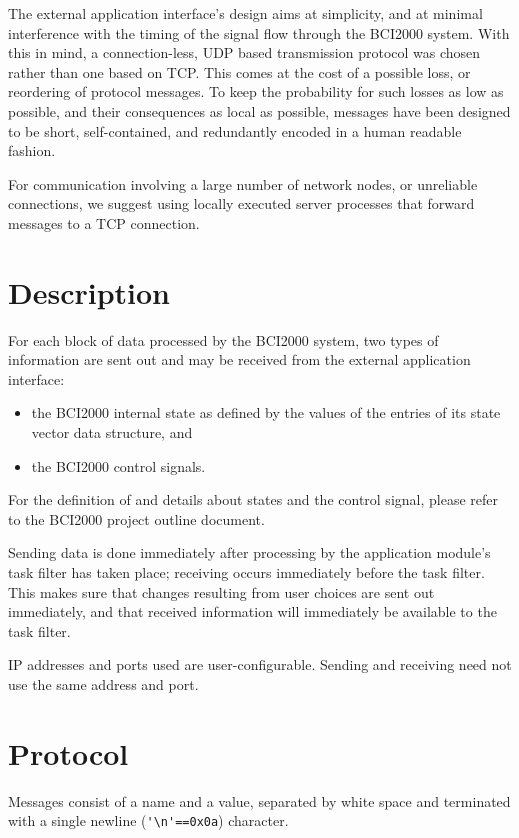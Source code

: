 \documentclass[12pt,letterpaper,notitlepage]{article}
\begin{document}
The external application interface's design aims at simplicity, and at minimal 
interference with the timing of the signal flow through the BCI2000 system. With 
this in mind, a connection-less, UDP based transmission protocol was chosen 
rather than one based on TCP. This comes at the cost of a possible loss, or 
reordering of protocol messages. To keep the probability for such losses as low 
as possible, and their consequences as local as possible, messages have been 
designed to be short, self-contained, and redundantly encoded in a human 
readable fashion.

For communication involving a large number of network nodes, or unreliable connections, we suggest 
using locally executed server processes that forward messages to a TCP connection.

\section{Description}

For each block of data processed by the BCI2000 system, two types of information are sent out
and may be received from the external application interface:
\begin{itemize}
\item the BCI2000 internal state as defined by the values of the entries of its state vector data structure, and
\item the BCI2000 control signals.
\end{itemize}
For the definition of and details about states and the control signal, please refer to the BCI2000
project outline document.

Sending data is done immediately after processing by the application module's task filter has taken place; 
receiving occurs immediately before the task filter.
This makes sure that changes resulting from user choices are sent out immediately, and that 
received information will immediately be available to the task filter.

IP addresses and ports used are user-configurable. Sending and receiving need not use the same address and port.


\section{Protocol}

Messages consist of a name and a value, separated by white space
and terminated with a single newline (\verb|'\n'==0x0a|) character.
\end{document}
